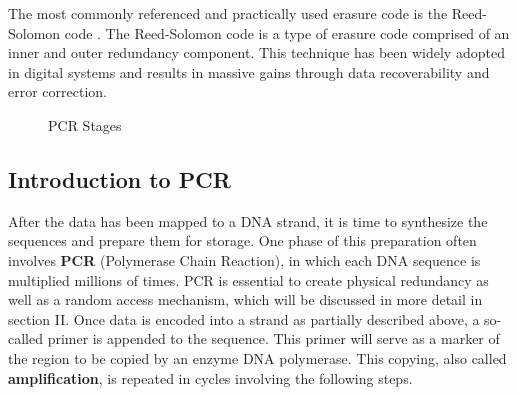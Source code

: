 \documentclass[a4paper,conference]{IEEEtran}
\begin{document}
The most commonly referenced and practically used erasure code is the Reed-Solomon code \cite{reed_polynomial_1960}. The Reed-Solomon code is a type of erasure code comprised of an inner and outer redundancy component. This technique has been widely adopted in digital systems and results in massive gains through data recoverability and error correction.


\begin{figure}[!t]
\centering
{}
\caption{PCR Stages}
\label{fig_sim}
\end{figure}

\subsection{Introduction to PCR}

After the data has been mapped to a DNA strand, it is time to synthesize the sequences and prepare them for storage. One phase of this preparation often involves \textbf{PCR} (Polymerase Chain Reaction), in which each DNA sequence is multiplied millions of times. PCR is essential to create physical redundancy as well as a random access mechanism, which will be discussed in more detail in section II. Once data is encoded into a strand as partially described above, a so-called primer is appended to the sequence. This primer will serve as a marker of the region to be copied by an enzyme DNA polymerase. This copying, also called \textbf{amplification}, is repeated in cycles involving the following steps. 
\end{document}
